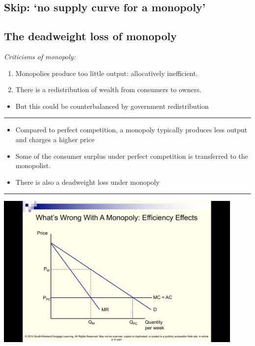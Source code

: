 \documentclass[]{article}
\providecommand{\tightlist}{%
  \setlength{\itemsep}{0pt}\setlength{\parskip}{0pt}}
\begin{document}
\hypertarget{skip-no-supply-curve-for-a-monopoly}{%
\subsection{Skip: `no supply curve for a monopoly'}\label{skip-no-supply-curve-for-a-monopoly}}

\hypertarget{the-deadweight-loss-of-monopoly}{%
\subsection{The deadweight loss of monopoly}\label{the-deadweight-loss-of-monopoly}}

\emph{Criticisms of monopoly:}

\begin{enumerate}
\def\labelenumi{\arabic{enumi}.}
\item
  Monopolies produce too little output: allocatively inefficient.
\item
  There is a redistribution of wealth from consumers to owners.
\end{enumerate}

\begin{itemize}
\tightlist
\item
  But this could be counterbalanced by government redistribution
\end{itemize}

\begin{center}\rule{0.5\linewidth}{\linethickness}\end{center}

\begin{itemize}
\item
  Compared to perfect competition, a monopoly typically produces less output and charges a higher price
\item
  Some of the consumer surplus under perfect competition is transferred to the monopolist.
\item
  There is also a deadweight loss under monopoly
\end{itemize}

\begin{center}\rule{0.5\linewidth}{\linethickness}\end{center}

\includegraphics[height=3in]{picsfigs/dwl1.png}
\end{document}
